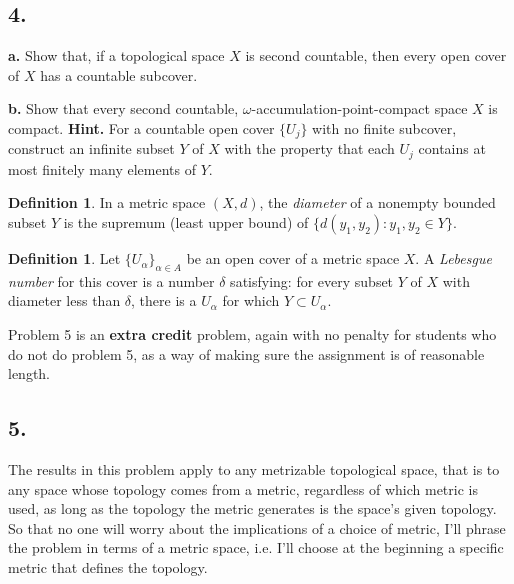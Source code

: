 \documentclass{amsart}
\theoremstyle{plain}
\theoremstyle{definition}
\newtheorem{definition}[theorem]{Definition}
\theoremstyle{remark}
\begin{document}
\vspace{.15in}
\noindent
\subsection*{4.} 

\noindent
{\bfseries a.} Show that, if a topological space $X$ is second countable, then every open cover of $X$ has a countable subcover.

\vspace{.1in}
\noindent
{\bfseries b.} Show that every second countable, $\omega$-accumulation-point-compact space $X$ is compact. {\bfseries Hint.} For a countable open cover $\{ U_j\}$ with no finite subcover, construct an infinite subset $Y$ of $X$ with the property that each $U_j$ contains at most finitely many elements of $Y$. 

\vspace{.15in}
\begin{definition} In a metric space $(X,d)$, the {\it diameter} of a nonempty bounded subset $Y$ is the supremum (least upper bound) of $\{ d(y_1, y_2) : y_1, y_2 \in Y\}$. \end{definition}

\vspace{.15in}
\begin{definition} Let $\{ U_{\alpha}\} _{\alpha \in A}$ be an open cover of a metric space $X$. A {\it Lebesgue number} for this cover is a number $\delta$ satisfying: for every subset $Y$ of $X$ with diameter less than $\delta$, there is a $U_{\alpha}$ for which $Y\subset U_{\alpha}$. \end{definition}

\vspace{.15in}
Problem 5 is an {\bf extra credit} problem, again with no penalty for students who do not do problem 5, as a way of making sure the assignment is of reasonable length.
 
\vspace{.15in}
\noindent
\subsection*{5.} The results in this problem apply to any metrizable topological space, that is to any space whose topology comes from a metric, regardless of which metric is used, as long as the topology the metric generates is the space's given topology. So that no one will worry about the implications of a choice of metric, I'll phrase the problem in terms of a metric space, i.e. I'll choose at the beginning a specific metric that defines the topology.  
\end{document}
